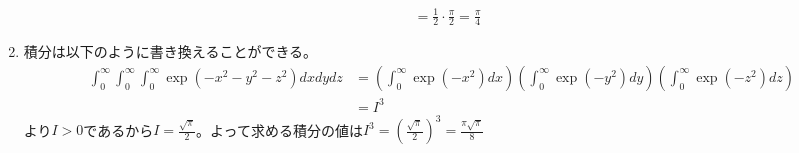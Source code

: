 \begin{souanswer}
\begin{enumerate}
\begin{align*}
	&= \frac{1}{2}\cdot \frac{\pi}{2}= \frac{\pi}{4}
\end{align*}
	\item 積分は以下のように書き換えることができる。
\begin{align*}
	\int_0^\infty \int_0^\infty\int_0^\infty \exp{(-x^2- y^2- z^2)}dxdydz
	&= \left(\int_0^\infty \exp(-x^2)dx\right)	\left(\int_0^\infty \exp(-y^2)dy\right)\left(\int_0^\infty \exp(-z^2)dz\right)\\
	&= I^3
\end{align*}
	より$I> 0$であるから$I= \frac{\sqrt{\pi}}{2}$。よって求める積分の値は$I^3= \left(\frac{\sqrt{\pi}}{2}\right)^3= \frac{\pi\sqrt{\pi}}{8}$
\end{enumerate}
\end{souanswer}